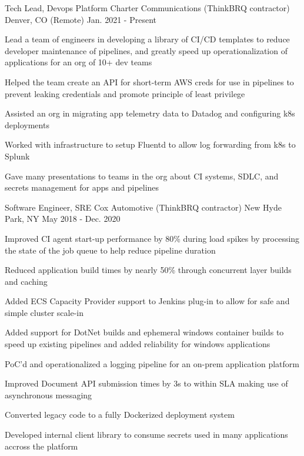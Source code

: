 \vspace{-3mm}

\begin{cventries}
  \vspace{1mm}
  \cventry
  {Tech Lead, Devops Platform}
  {Charter Communications (ThinkBRQ contractor)}
  {Denver, CO (Remote)}
  {Jan. 2021 - Present}
  {
    \begin{cvitems} %
		\item {Lead a team of engineers in developing a library of CI/CD templates
        to reduce developer maintenance of pipelines, and greatly speed up
        operationalization of applications for an org of 10+ dev teams}
		\item {Helped the team create an API for short-term AWS creds for use in
        pipelines to prevent leaking credentials and promote principle of least
        privilege}
    \item {Assisted an org in migrating app telemetry data to Datadog and
        configuring k8s deployments}
    \item {Worked with infrastructure to setup Fluentd to allow log forwarding
        from k8s to Splunk}
    \item {Gave many presentations to teams in the org about CI systems, SDLC, and secrets
        management for apps and pipelines}
    \end{cvitems}
  }
  \vspace{1mm}

  \cventry
  {Software Engineer, SRE}
  {Cox Automotive (ThinkBRQ contractor)}
  {New Hyde Park, NY}
  {May 2018 - Dec. 2020}
  {
    \begin{cvitems}
        \item{ Improved CI agent start-up performance by 80\% during load spikes by
            processing the state of the job queue to help reduce pipeline duration}
        \item { Reduced application build times by nearly 50\% through
            concurrent layer builds and caching }
        \item { Added ECS Capacity Provider support to Jenkins plug-in to allow
            for safe and simple cluster scale-in }
        \item { Added support for DotNet builds and ephemeral windows container
            builds to speed up existing pipelines and added reliability for
            windows applications}
        \item { PoC’d and operationalized a logging pipeline for an
            on-prem application platform }
        \item { Improved Document API submission times by 3s to within SLA
            making use of asynchronous messaging }
        \item { Converted legacy code to a fully Dockerized
            deployment system }
        \item { Developed internal client library to consume secrets
            used in many applications accross the platform }
    \end{cvitems}
  }
  \vspace{1mm}


\end{cventries}
